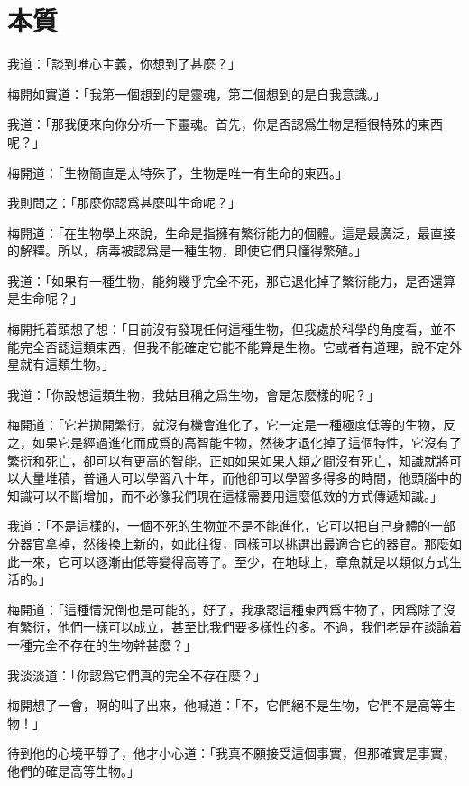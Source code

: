 \chapter{本質}

我道：「談到唯心主義，你想到了甚麼？」

梅開如實道：「我第一個想到的是靈魂，第二個想到的是自我意識。」

我道：「那我便來向你分析一下靈魂。首先，你是否認爲生物是種很特殊的東西呢？」

梅開道：「生物簡直是太特殊了，生物是唯一有生命的東西。」

我則問之：「那麼你認爲甚麼叫生命呢？」

梅開道：「在生物學上來說，生命是指擁有繁衍能力的個體。這是最廣泛，最直接的解釋。所以，病毒被認爲是一種生物，即使它們只懂得繁殖。」

我道：「如果有一種生物，能夠幾乎完全不死，那它退化掉了繁衍能力，是否還算是生命呢？」

梅開托着頭想了想：「目前沒有發現任何這種生物，但我處於科學的角度看，並不能完全否認這類東西，但我不能確定它能不能算是生物。它或者有道理，說不定外星就有這類生物。」

我道：「你設想這類生物，我姑且稱之爲生物，會是怎麼樣的呢？」

梅開道：「它若拋開繁衍，就沒有機會進化了，它一定是一種極度低等的生物，反之，如果它是經過進化而成爲的高智能生物，然後才退化掉了這個特性，它沒有了繁衍和死亡，卻可以有更高的智能。正如如果如果人類之間沒有死亡，知識就將可以大量堆積，普通人可以學習八十年，而他卻可以學習多得多的時間，他頭腦中的知識可以不斷增加，而不必像我們現在這樣需要用這麼低效的方式傳遞知識。」

我道：「不是這樣的，一個不死的生物並不是不能進化，它可以把自己身體的一部分器官拿掉，然後換上新的，如此往復，同樣可以挑選出最適合它的器官。那麼如此一來，它可以逐漸由低等變得高等了。至少，在地球上，章魚就是以類似方式生活的。」

梅開道：「這種情況倒也是可能的，好了，我承認這種東西爲生物了，因爲除了沒有繁衍，他們一樣可以成立，甚至比我們要多樣性的多。不過，我們老是在談論着一種完全不存在的生物幹甚麼？」

我淡淡道：「你認爲它們真的完全不存在麼？」

梅開想了一會，啊的叫了出來，他喊道：「不，它們絕不是生物，它們不是高等生物！」

待到他的心境平靜了，他才小心道：「我真不願接受這個事實，但那確實是事實，他們的確是高等生物。」

